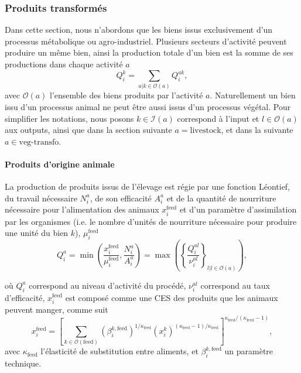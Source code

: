 \subsubsection{Produits transformés}
Dans cette section, nous n’abordons que les biens issus exclusivement d’un processus métabolique ou agro-industriel. Plusieurs secteurs d’activité peuvent produire un même bien, ainsi la production totale d’un bien est la somme de ses productions dans chaque activité $a$
\begin{equation}\label{eq_qik}
    Q_i^k = \sum_{a|k\in \mathcal{O}(a)} Q_i^{ak},
\end{equation}
avec $\mathcal{O}(a)$ l’ensemble des biens produits par l’activité $a$. Naturellement un bien issu d’un processus animal ne peut être aussi issus d’un processus végétal. Pour simplifier les notations, nous posons $k \in \mathcal{I}(a)$ correspond à l’input et $l \in \mathcal{O}(a)$ aux outputs, ainsi que dans la section suivante $a = \text{livestock}$, et dans la suivante $a \in \text{veg-transfo}$.

\paragraph{Produits d’origine animale} La production de produits issus de l'élevage est régie par une fonction Léontief, du travail nécessaire $N_i^a$, de son efficacité $A_i^a$ et de la quantité de nourriture nécessaire pour l’alimentation des animaux $x_i^\text{feed}$ et d’un paramètre d’assimilation par les organismes (i.e. le nombre d’unités de nourriture nécessaire pour produire une unité du bien $k$), $\mu_i^\text{feed}$
\begin{equation}\label{eq_qlivestock}
    Q_i^a = \min \left(\frac{x^{\text{feed}}_i}{\mu^{\text{feed}}_i}, \frac{N_i^a}{A_i^a}\right) = \max \left( \left\{ \frac{Q_i^{al}}{\nu^{al}_i} \right\}_{l|l\in\mathcal{O}(a)} \right),
\end{equation}

où $Q_i^a$ correspond au niveau d’activité du procédé, $\nu_i^{al}$ correspond au taux d’efficacité, $x_i^\text{feed}$ est composé comme une CES des produits que les animaux peuvent manger, comme suit
\begin{equation}
    x_i^\text{feed} = \left[ \sum_{k \in \mathcal{O}(\text{feed})} (\beta_i^{k, \text{feed}})^{1/\kappa_\text{feed}} (x_i^k)^{(\kappa_{\text{feed}} - 1) / \kappa_{\text{feed}}}  \right]^{\kappa_{\text{feed}}/(\kappa_{\text{feed}} - 1)},
\end{equation}
avec $\kappa_{\text{feed}}$ l’élasticité de substitution entre aliments, et $\beta_i^{k, \text{feed}}$ un paramètre technique.

